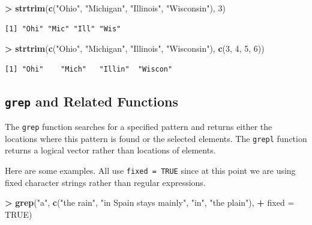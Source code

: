 \documentclass[
]{krantz}
\makeatletter
\newenvironment{Shaded}{\begin{snugshade}}{\end{snugshade}}
\newcommand{\DataTypeTok}[1]{\textcolor[rgb]{0.27,0.27,0.27}{#1}}
\newcommand{\DecValTok}[1]{\textcolor[rgb]{0.06,0.06,0.06}{#1}}
\newcommand{\KeywordTok}[1]{\textcolor[rgb]{0.27,0.27,0.27}{\textbf{#1}}}
\newcommand{\NormalTok}[1]{#1}
\newcommand{\OperatorTok}[1]{\textcolor[rgb]{0.43,0.43,0.43}{\textbf{#1}}}
\newcommand{\OtherTok}[1]{\textcolor[rgb]{0.37,0.37,0.37}{#1}}
\newcommand{\StringTok}[1]{\textcolor[rgb]{0.5,0.5,0.5}{#1}}
\newenvironment{kframe}{%
\medskip{}
\setlength{\fboxsep}{.8em}
 \def\at@end@of@kframe{}%
 \ifinner\ifhmode%
  \def\at@end@of@kframe{\end{minipage}}%
  \begin{minipage}{\columnwidth}%
 \fi\fi%
 \def\FrameCommand##1{\hskip\@totalleftmargin \hskip-\fboxsep
 \colorbox{shadecolor}{##1}\hskip-\fboxsep
     \hskip-\linewidth \hskip-\@totalleftmargin \hskip\columnwidth}%
 \MakeFramed {\advance\hsize-\width
   \@totalleftmargin\z@ \linewidth\hsize
   \@setminipage}}%
 {\par\unskip\endMakeFramed%
 \at@end@of@kframe}
\renewenvironment{Shaded}{\begin{kframe}}{\end{kframe}}
\makeatother
\begin{document}
\begin{Shaded}
\begin{Highlighting}[]
\OperatorTok{\textgreater{}}\StringTok{ }\KeywordTok{strtrim}\NormalTok{(}\KeywordTok{c}\NormalTok{(}\StringTok{"Ohio"}\NormalTok{, }\StringTok{"Michigan"}\NormalTok{, }\StringTok{"Illinois"}\NormalTok{, }\StringTok{"Wisconsin"}\NormalTok{), }\DecValTok{3}\NormalTok{)}
\end{Highlighting}
\end{Shaded}

\begin{verbatim}
[1] "Ohi" "Mic" "Ill" "Wis"
\end{verbatim}

\begin{Shaded}
\begin{Highlighting}[]
\OperatorTok{\textgreater{}}\StringTok{ }\KeywordTok{strtrim}\NormalTok{(}\KeywordTok{c}\NormalTok{(}\StringTok{"Ohio"}\NormalTok{, }\StringTok{"Michigan"}\NormalTok{, }\StringTok{"Illinois"}\NormalTok{, }\StringTok{"Wisconsin"}\NormalTok{), }\KeywordTok{c}\NormalTok{(}\DecValTok{3}\NormalTok{, }\DecValTok{4}\NormalTok{, }\DecValTok{5}\NormalTok{, }\DecValTok{6}\NormalTok{))}
\end{Highlighting}
\end{Shaded}

\begin{verbatim}
[1] "Ohi"    "Mich"   "Illin"  "Wiscon"
\end{verbatim}

\hypertarget{grep-and-related-functions}{%
\subsection{\texorpdfstring{\texttt{grep} and Related Functions}{grep and Related Functions}}\label{grep-and-related-functions}}

The \texttt{grep} function searches for a specified pattern and returns either the locations where this pattern is found or the selected elements. The \texttt{grepl} function returns a logical vector rather than locations of elements.

Here are some examples. All use \texttt{fixed\ =\ TRUE} since at this point we are using fixed character strings rather than regular expressions.

\begin{Shaded}
\begin{Highlighting}[]
\OperatorTok{\textgreater{}}\StringTok{ }\KeywordTok{grep}\NormalTok{(}\StringTok{"a"}\NormalTok{, }\KeywordTok{c}\NormalTok{(}\StringTok{"the rain"}\NormalTok{, }\StringTok{"in Spain    stays mainly"}\NormalTok{, }\StringTok{"in"}\NormalTok{, }\StringTok{"the plain"}\NormalTok{), }
\OperatorTok{+}\StringTok{      }\DataTypeTok{fixed =} \OtherTok{TRUE}\NormalTok{)}
\end{Highlighting}
\end{Shaded}
\end{document}
